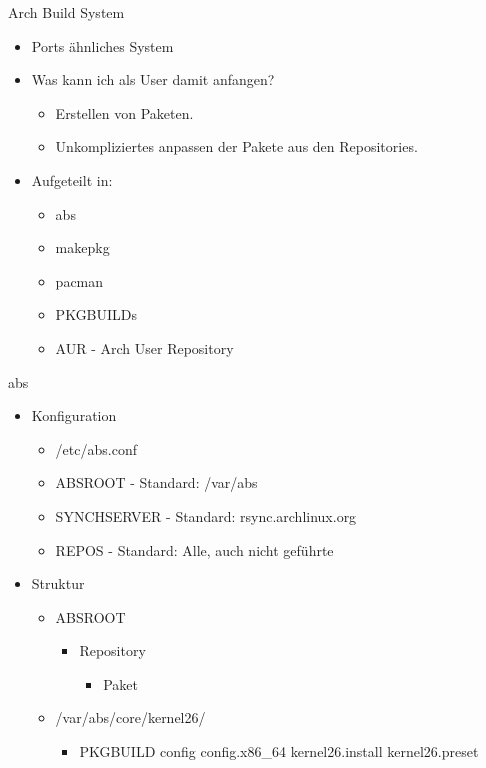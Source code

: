 
\begin{slide}{Arch Build System}
	\begin{itemize}
		\item{Ports \"{a}hnliches System}
		\item{Was kann ich als User damit anfangen?
			\begin{itemize}
				\item{Erstellen von Paketen.}
				\item{Unkompliziertes anpassen der Pakete aus den 
					Repositories.}
			\end{itemize}
		}
		\item{Aufgeteilt in:
			\begin{itemize}
				\item{abs}
				\item{makepkg}
				\item{pacman}
				\item{PKGBUILDs}
				\item{AUR - Arch User Repository}
			\end{itemize}
		}
	\end{itemize}
\end{slide}

\begin{slide}{abs}
	\begin{itemize}
		\item{Konfiguration
			\begin{itemize}
				\item{/etc/abs.conf}
				\item{ABSROOT -  Standard: /var/abs}
				\item{SYNCHSERVER - Standard: rsync.archlinux.org}
				\item{REPOS - Standard: Alle, auch nicht gef\"{u}hrte}
			\end{itemize}
		}
		\item{Struktur
			\begin{itemize}
				\item{ABSROOT
					\begin{itemize}
						\item{Repository
							\begin{itemize}
								\item{Paket}
							\end{itemize}
						}
					\end{itemize}
				}
				\item{/var/abs/core/kernel26/
					\begin{itemize}
						\item{PKGBUILD config config.x86\_64 kernel26.install
							kernel26.preset}
					\end{itemize}
				}
			\end{itemize}
		}
	\end{itemize}
\end{slide}

